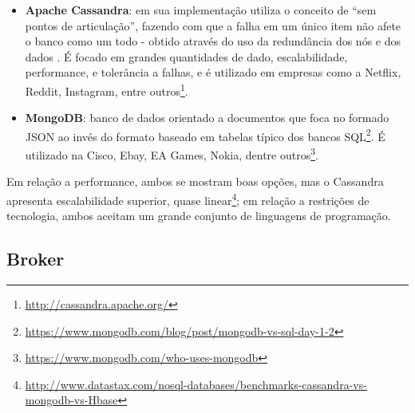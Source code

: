 \begin{itemize}
    \item \textbf{Apache Cassandra}: em sua implementação utiliza o conceito
        de ``sem pontos de articulação'', fazendo com que a falha em um único
        item não afete o banco como um todo - obtido através do uso da
        redundância dos nós e dos dados \cite{estrada2016}. É focado em grandes
        quantidades de dado, escalabilidade, performance, e tolerância a falhas,
        e é utilizado em empresas como a Netflix, Reddit, Instagram, entre
        outros\footnote{\url{http://cassandra.apache.org/}}.

    \item \textbf{MongoDB}: banco de dados orientado a documentos que foca no
        formado JSON ao invés do formato baseado em tabelas típico dos bancos
        SQL\footnote{\url{https://www.mongodb.com/blog/post/mongodb-vs-sql-day-1-2}}.
        É utilizado na Cisco, Ebay, EA Games, Nokia, dentre
        outros\footnote{\url{https://www.mongodb.com/who-uses-mongodb}}.
\end{itemize}

Em relação a performance, ambos se mostram boas opções, mas o Cassandra
apresenta escalabilidade superior, quase
linear\footnote{\url{http://www.datastax.com/nosql-databases/benchmarks-cassandra-vs-mongodb-vs-Hbase}};
em relação a restrições de tecnologia, ambos aceitam um grande conjunto de
linguagens de programação.

\subsection{Broker}

